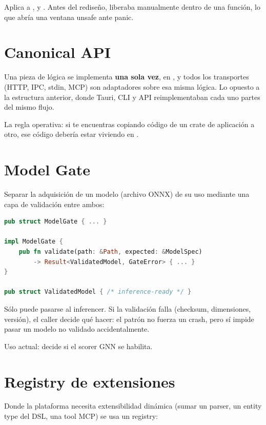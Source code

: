 Aplica a ,  y . Antes
del rediseño,  liberaba manualmente dentro de una
función, lo que abría una ventana unsafe ante panic.

\section{Canonical API}

Una pieza de lógica se implementa \textbf{una sola vez},
en , y todos los transportes (HTTP, IPC,
stdin, MCP) son adaptadores sobre esa misma lógica. Lo opuesto a
la estructura anterior, donde Tauri, CLI y API reimplementaban cada
uno partes del mismo flujo.

La regla operativa: si te encuentras copiando código de un crate
de aplicación a otro, ese código debería estar viviendo en
.

\section{Model Gate}

Separar la adquisición de un modelo (archivo ONNX) de su uso
mediante una capa de validación entre ambos:

\begin{lstlisting}[language=Rust]
pub struct ModelGate { ... }

impl ModelGate {
    pub fn validate(path: &Path, expected: &ModelSpec)
        -> Result<ValidatedModel, GateError> { ... }
}

pub struct ValidatedModel { /* inference-ready */ }
\end{lstlisting}

Sólo  puede pasarse al inferencer. Si la
validación falla (checksum, dimensiones, versión), el caller
decide qué hacer: el patrón no fuerza un crash, pero sí impide
pasar un modelo no validado accidentalmente.

Uso actual:  decide si el
scorer GNN se habilita.

\section{Registry de extensiones}

Donde la plataforma necesita extensibilidad dinámica (sumar un
parser, un entity type del DSL, una tool MCP) se usa un registry:

